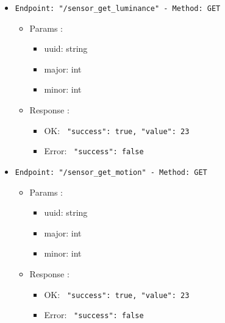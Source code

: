 \begin{itemize}
  \item \texttt{Endpoint: "/sensor_get_luminance" -  Method: GET}
  \begin{itemize} 
    \item Params :
    \begin{itemize}
      \item uuid: string
      \item major: int
      \item minor: int
    \end{itemize}

    \item Response : 
    \begin{itemize}
      \item OK: \texttt{{ "success": true, "value": 23 }}
      \item Error: \texttt{{ "success": false }}
    \end{itemize}
  \end{itemize}
\end{itemize}

\begin{itemize}
  \item \texttt{Endpoint: "/sensor_get_motion" -  Method: GET}
  \begin{itemize} 
    \item Params :
    \begin{itemize}
      \item uuid: string
      \item major: int
      \item minor: int
    \end{itemize}

    \item Response : 
    \begin{itemize}
      \item OK: \texttt{{ "success": true, "value": 23 }}
      \item Error: \texttt{{ "success": false }}
    \end{itemize}
  \end{itemize}
\end{itemize}

